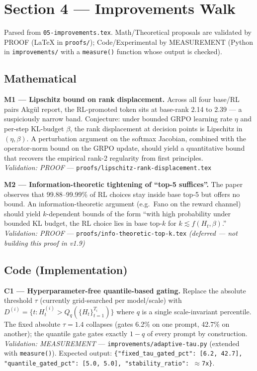 \documentclass[11pt]{article}
\begin{document}
\section*{Section 4 --- Improvements Walk}

Parsed from \texttt{05-improvements.tex}. Math/Theoretical proposals are validated by PROOF (LaTeX in \texttt{proofs/}); Code/Experimental by MEASUREMENT (Python in \texttt{improvements/} with a \texttt{measure()} function whose output is checked).

\subsection*{Mathematical}

\textbf{M1 --- Lipschitz bound on rank displacement.} Across all four base/RL pairs Akg\"ul report, the RL-promoted token sits at base-rank 2.14 to 2.39 --- a suspiciously narrow band. Conjecture: under bounded GRPO learning rate $\eta$ and per-step KL-budget $\beta$, the rank displacement at decision points is Lipschitz in $(\eta, \beta)$. A perturbation argument on the softmax Jacobian, combined with the operator-norm bound on the GRPO update, should yield a quantitative bound that recovers the empirical rank-2 regularity from first principles. \\
\textit{Validation: PROOF} --- \texttt{proofs/lipschitz-rank-displacement.tex}

\textbf{M2 --- Information-theoretic tightening of ``top-5 suffices''.} The paper observes that 99.88--99.99\% of RL choices stay inside base top-5 but offers no bound. An information-theoretic argument (e.g.\ Fano on the reward channel) should yield $k$-dependent bounds of the form ``with high probability under bounded KL budget, the RL choice lies in base top-$k$ for $k \lesssim f(H_t, \beta)$.'' \\
\textit{Validation: PROOF} --- \texttt{proofs/info-theoretic-top-k.tex} \emph{(deferred --- not building this proof in v1.9)}

\subsection*{Code (Implementation)}

\textbf{C1 --- Hyperparameter-free quantile-based gating.} Replace the absolute threshold $\tau$ (currently grid-searched per model/scale) with $D^{(i)} = \{t : H_t^{(i)} > Q_q(\{H_t\}_{t=1}^{T_i})\}$ where $q$ is a single scale-invariant percentile. The fixed absolute $\tau = 1.4$ collapses (gates 6.2\% on one prompt, 42.7\% on another); the quantile gate gates exactly $1-q$ of every prompt by construction. \\
\textit{Validation: MEASUREMENT} --- \texttt{improvements/adaptive-tau.py} (extended with \texttt{measure()}). Expected output: \texttt{\{"fixed\_tau\_gated\_pct": [6.2, 42.7], "quantile\_gated\_pct": [5.0, 5.0], "stability\_ratio": $\approx$7x\}}.
\end{document}
